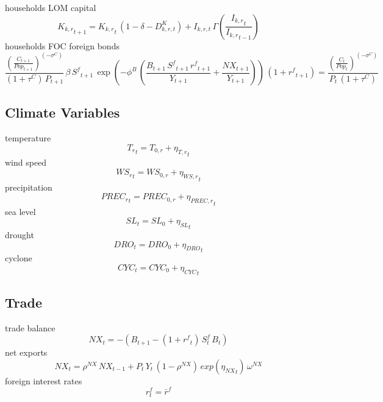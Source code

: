 households LOM capital
\begin{dmath}
{{K_{k,r}}_{t+1}}={{K_{k,r}}_{t}}\, \left(1-{{\delta}}-D^K_{k,r,t}\right) + I_{k,r,t} \, \Gamma\left(\frac{{{I_{k,r}}_{t}}}{{{I_{k,r}}_{t-1}}}\right)
\end{dmath}
households FOC foreign bonds
\begin{dmath}
\frac{\left(\frac{{C}_{t+1}}{{Pop}_{t+1}}\right)^{\left(-{{\sigma^{C}}}\right)}}{\left(1+{{\tau^{C}}}\right)\, {P}_{t+1}}\, {{\beta}}\, {S^{f}}_{t+1}\, \exp\left(-\phi^{B}\, \left(\frac{{B}_{t+1}\, {S^{f}}_{t+1}\, {{r^{f}}}_{t+1}}{{Y}_{t+1}}+\frac{{NX}_{t+1}}{{Y}_{t+1}}\right)\right)\, \left(1+{{r^{f}}}_{t+1}\right)=\frac{\left(\frac{{C}_{t}}{{Pop}_{t}}\right)^{\left(-{{\sigma^{C}}}\right)}}{{P}_{t}\, \left(1+{{\tau^{C}}}\right)}
\end{dmath}

\subsection{Climate Variables}
temperature
\begin{dmath}
{{T_{r}}_{t}}={{T_{0,r}}}+{{\eta_{T,r}}_{t}}
\end{dmath}
wind speed
\begin{dmath}
{{WS_{r}}_{t}}={{WS_{0,r}}}+{{\eta_{WS,r}}_{t}}
\end{dmath}
precipitation
\begin{dmath}
{{PREC_{r}}_{t}}={{PREC_{0,r}}}+{{\eta_{PREC,r}}_{t}}
\end{dmath}
sea level
\begin{dmath}
{{SL}_{t}}={{SL_0}}+{{\eta_{SL}}_{t}}
\end{dmath}
drought
\begin{dmath}
{{DRO}_{t}}={{DRO_0}}+{{\eta_{DRO}}_{t}}
\end{dmath}
cyclone
\begin{dmath}
{{CYC}_{t}}={{CYC_0}}+{{\eta_{CYC}}_{t}}
\end{dmath}

\subsection{Trade}
trade balance
\begin{dmath}
{NX_{t}}=-\left({B_{t+1}}-\left(1+{{r^{f}}_{t}}\right) \, S^{f}_{t} \, {B_{t}}\right)
\end{dmath}
net exports
\begin{dmath}
{NX_{t}}={{\rho^{NX}}}\, {NX_{t-1}}+{P_{t} \, Y_{t}}\, \left(1-{{\rho^{NX}}}\right)\, exp\left({{\eta_{NX}}_{t}}\right)\, {{\omega^{NX}}}
\end{dmath}
foreign interest rates
\begin{dmath}
r^{f}_{t} = \bar{r}^{f}
\end{dmath}

